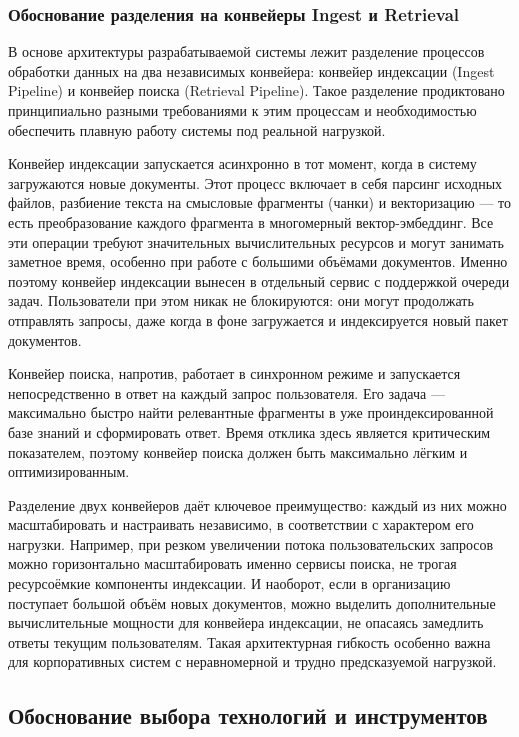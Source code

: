 \subsubsection{Обоснование разделения на конвейеры Ingest и Retrieval}

В основе архитектуры разрабатываемой системы лежит разделение процессов обработки данных на два независимых конвейера: конвейер индексации (Ingest Pipeline) и конвейер поиска (Retrieval Pipeline). Такое разделение продиктовано принципиально разными требованиями к этим процессам и необходимостью обеспечить плавную работу системы под реальной нагрузкой.

Конвейер индексации запускается асинхронно в тот момент, когда в систему загружаются новые документы. Этот процесс включает в себя парсинг исходных файлов, разбиение текста на смысловые фрагменты (чанки) и векторизацию — то есть преобразование каждого фрагмента в многомерный вектор-эмбеддинг. Все эти операции требуют значительных вычислительных ресурсов и могут занимать заметное время, особенно при работе с большими объёмами документов. Именно поэтому конвейер индексации вынесен в отдельный сервис с поддержкой очереди задач. Пользователи при этом никак не блокируются: они могут продолжать отправлять запросы, даже когда в фоне загружается и индексируется новый пакет документов.

Конвейер поиска, напротив, работает в синхронном режиме и запускается непосредственно в ответ на каждый запрос пользователя. Его задача — максимально быстро найти релевантные фрагменты в уже проиндексированной базе знаний и сформировать ответ. Время отклика здесь является критическим показателем, поэтому конвейер поиска должен быть максимально лёгким и оптимизированным.

Разделение двух конвейеров даёт ключевое преимущество: каждый из них можно масштабировать и настраивать независимо, в соответствии с характером его нагрузки. Например, при резком увеличении потока пользовательских запросов можно горизонтально масштабировать именно сервисы поиска, не трогая ресурсоёмкие компоненты индексации. И наоборот, если в организацию поступает большой объём новых документов, можно выделить дополнительные вычислительные мощности для конвейера индексации, не опасаясь замедлить ответы текущим пользователям. Такая архитектурная гибкость особенно важна для корпоративных систем с неравномерной и трудно предсказуемой нагрузкой.


\subsection{Обоснование выбора технологий и инструментов}

